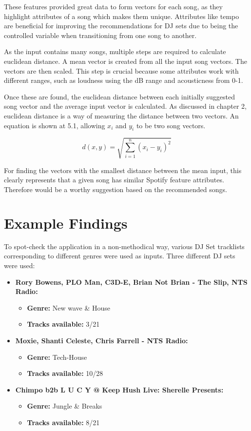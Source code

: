 These features provided great data to form vectors for each song, as they highlight attributes of a song which makes them unique. Attributes like tempo are beneficial for improving the recommendations for DJ sets due to being the controlled variable when transitioning from one song to another.

As the input contains many songs, multiple steps are required to calculate euclidean distance. A mean vector is created from all the input song vectors. The vectors are then scaled. This step is crucial because some attributes work with different ranges, such as loudness using the dB range and acousticness from 0-1.

Once these are found, the euclidean distance between each initially suggested song vector and the average input vector is calculated. As discussed in chapter 2, euclidean distance is a way of measuring the distance between two vectors. An equation is shown at 5.1, allowing $x_{i}$ and $y_{i}$ to be two song vectors.

\begin{equation}
	d(x,y) = \sqrt{\sum _{i=1} ^{n}(x_{i} - y_{i})^{2}}
\end{equation}

For finding the vectors with the smallest distance between the mean input, this clearly represents that a given song has similar Spotify feature attributes. Therefore would be a worthy suggestion based on the recommended songs.

\section{Example Findings}
To spot-check the application in a non-methodical way, various DJ Set tracklists corresponding to different genres were used as inputs. Three different DJ sets were used:

\begin{itemize}
	\item \textbf{Rory Bowens, PLO Man, C3D-E, Brian Not Brian - The Slip, NTS Radio: } 
	\begin{itemize}
		\item \textbf{Genre:} New wave \& House
		\item \textbf{Tracks available:} 3/21
	\end{itemize}
	\item \textbf{Moxie, Shanti Celeste, Chris Farrell - NTS Radio: } 
	\begin{itemize}
		\item \textbf{Genre:} Tech-House
		\item \textbf{Tracks available:} 10/28
	\end{itemize}
	\item \textbf{Chimpo b2b L U C Y @ Keep Hush Live: Sherelle Presents:}
	\begin{itemize}
		\item \textbf{Genre:} Jungle \& Breaks
		\item \textbf{Tracks available:} 8/21
	\end{itemize}
	
\end{itemize}


